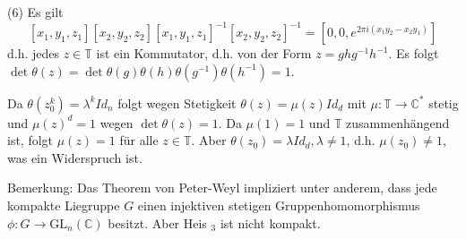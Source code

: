 \documentclass[10pt, letterpaper]{article}
\begin{document}
(6) Es gilt
$$
\left[x_{1}, y_{1}, z_{1}\right]\left[x_{2}, y_{2}, z_{2}\right]\left[x_{1}, y_{1}, z_{1}\right]^{-1}\left[x_{2}, y_{2}, z_{2}\right]^{-1}=\left[0,0, e^{2 \pi i\left(x_{1} y_{2}-x_{2} y_{1}\right)}\right]
$$
d.h. jedes $z \in \mathbb{T}$ ist ein Kommutator, d.h. von der Form $z= g h g^{-1} h^{-1}$. Es folgt $\operatorname{det} \theta(z)=\operatorname{det} \theta(g) \theta(h) \theta\left(g^{-1}\right) \theta\left(h^{-1}\right)=1$.


Da $\theta\left(z_{0}^{k}\right)=\lambda^{k} I d_{n}$ folgt wegen Stetigkeit $\theta(z)=\mu(z) I d_{d}$ mit $\mu: \mathbb{T} \rightarrow \mathbb{C}^{*}$ stetig und $\mu(z)^{d}=1$ wegen $\operatorname{det} \theta(z)=1$. Da $\mu(1)=1$ und $\mathbb{T}$ zusammenhängend ist, folgt $\mu(z)=1$ für alle $z \in \mathbb{T}$. Aber $\theta\left(z_{0}\right)=\lambda I d_{d}, \lambda \neq 1$, d.h. $\mu\left(z_{0}\right) \neq 1$, was ein Widerspruch ist.

Bemerkung: Das Theorem von Peter-Weyl impliziert unter anderem, dass jede kompakte Liegruppe $G$ einen injektiven stetigen Gruppenhomomorphismus $\phi: G \rightarrow \mathrm{GL}_{n}(\mathbb{C})$ besitzt. Aber Heis ${ }_{3}$ ist nicht kompakt.



\pagebreak
\printbibliography
\end{document}
